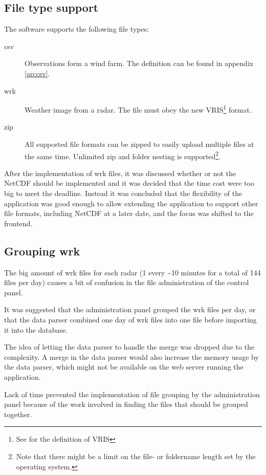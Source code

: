 \subsection{File type support}
\label{sec:file_type_support}
The software supports the following file types:
\begin{description}
\item[csv] Observations form a wind farm. The definition can be found in appendix \ref{ap:csv}.
\item[wrk] Weather image from a radar. The file must obey the new VRIS\footnote{See \cite{VRIS} for the definition of VRIS} format.
\item[zip] All supported file formats can be zipped to easily upload multiple files at the same time. Unlimited zip and folder nesting is supported\footnote{Note that there might be a limit on the file- or foldername length set by the operating system.}.
\end{description}

After the implementation of wrk files, it was discussed whether or not the NetCDF should be implemented and it was decided that the time cost were too big to meet the deadline. Instead it was concluded that the flexibility of the application was good enough to allow extending the application to support other file formats, including NetCDF at a later date, and the focus was shifted to the frontend.

\subsection{Grouping wrk}
\label{sec:grouping_wrk}
The big amount of wrk files for each radar (1 every \textasciitilde 10 minutes for a total of 144 files per day) causes a bit of confusion in the file administration of the control panel.

It was suggested that the administration panel grouped the wrk files per day, or that the data parser combined one day of wrk files into one file before importing it into the database.

The idea of letting the data parser to handle the merge was dropped due to the complexity. A merge in the data parser would also increase the memory usage by the data parser, which might not be available on the web server running the application.

Lack of time prevented the implementation of file grouping by the administration panel because of the work involved in finding the files that should be grouped together.

